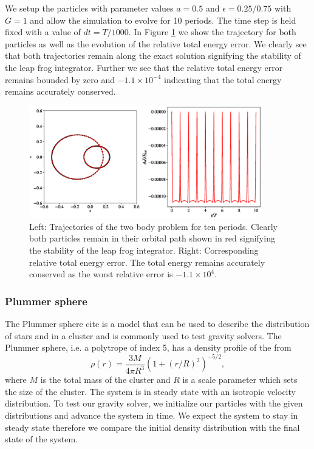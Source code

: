 We setup the particles with parameter values $a=0.5$ and $\epsilon=0.25/0.75$ with $G=1$ and allow
the simulation to evolve for 10 periods. The time step is held fixed with a value of $dt=T/1000$.
In Figure \ref{fig.two_body} we show the trajectory for both particles as well as the evolution of
the relative total energy error. We clearly see that both trajectories remain along the exact solution
signifying the stability of the leap frog integrator. Further we see that the relative total energy
error remains bounded by zero and $-1.1\times10^{-4}$ indicating that the total energy remains
accurately conserved.
\begin{figure}
    \begin{center}
        \includegraphics[width=0.9\textwidth]{figures/two_body.eps}
        \caption{Left: Trajectories of the two body problem for ten periods. Clearly
        both particles remain in their orbital path shown in red signifying the stability
        of the leap frog integrator. Right: Corresponding relative total energy error.
        The total energy remains accurately conserved as the worst relative error is
        $-1.1\times10^{4}$.}
        \label{fig.two_body}
    \end{center}
\end{figure}

\subsubsection{Plummer sphere}
The Plummer sphere cite is a model that can be used to describe the distribution of stars and in a cluster
and is commonly used to test gravity solvers. The Plummer sphere, i.e. a polytrope of index 5,
has a density profile of the from
\begin{equation}
	\rho (r) = \frac{3 M}{4\pi R^3} \left(1 + (r/R)^2\right)^{-5/2},
    \label{eq.plummer}
\end{equation}
where $M$ is the total mass of the cluster and $R$ is a scale parameter which sets the
size of the cluster. The system is in steady state with an isotropic velocity distribution.
To test our gravity solver, we initialize our particles with the given distributions and
advance the system in time. We expect the system to stay in steady state therefore we compare
the initial density distribution with the final state of the system.

